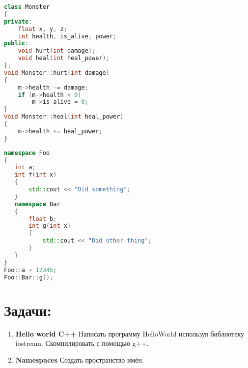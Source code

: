 \documentclass{article}
\begin{document}


\begin{multicols}{2}
\begin{lstlisting}[language=C++,basicstyle=\ttfamily,keywordstyle=\color{blue}]
class Monster
{
private:
    float x, y, z;
    int health, is_alive, power;
public:
    void hurt(int damage);
    void heal(int heal_power);
};
void Monster::hurt(int damage)
{
    m->health -= damage;
    if (m->health < 0)
        m->is_alive = 0;
}
void Monster::heal(int heal_power)
{
    m->health += heal_power;
}
\end{lstlisting}
\begin{lstlisting}[language=C++,basicstyle=\ttfamily,keywordstyle=\color{blue}]
namespace Foo
{
   int a;
   int f(int x)
   {
       std::cout << "Did something";
   }
   namespace Bar
   {
       float b;
       int g(int x)
       {
           std::cout << "Did other thing";
       }
   }
}
Foo::a = 12345;
Foo::Bar::g();
\end{lstlisting}
\end{multicols}
\section*{Задачи:}
\begin{enumerate}
\item \textbf{Hello world C++} Написать программу HelloWorld используя библиотеку iostream. Скомпилировать с помощью g++.
\item \textbf{Namespaces} Создать пространство имён.

\end{enumerate}
\end{document}
